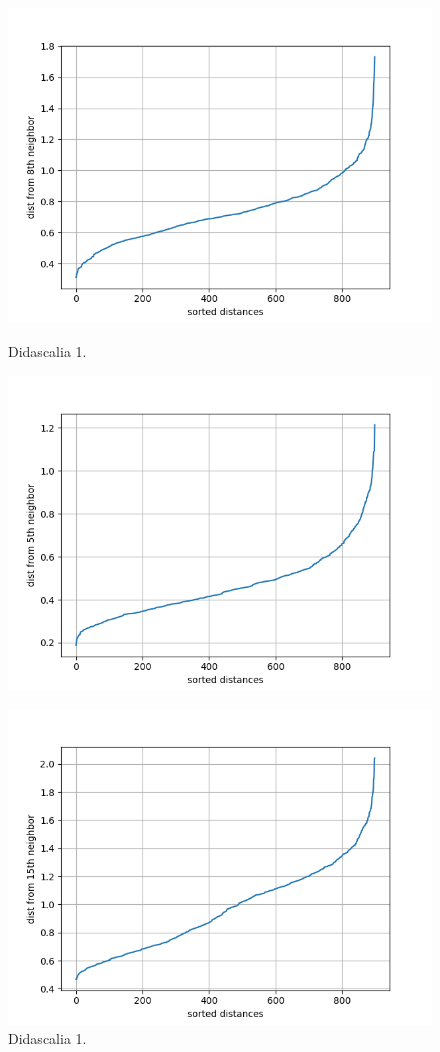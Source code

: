 \documentclass[english]{article}
\begin{document}
\begin{figure}[H]
\begin{minipage}[b]{0.45\textwidth}
\centering
\includegraphics[width=\textwidth]{./Figure/Cluster/dbscan/2ok/Figure_1.png}
\caption{Didascalia 1.}
\label{etichetta1}
\centering
\includegraphics[width=\textwidth]{./Figure/Cluster/dbscan/4/Figure_1.png}
\caption{Didascalia 1.}
\label{etichetta1}
\centering
\includegraphics[width=\textwidth]{./Figure/Cluster/dbscan/5/Figure_1.png}

\end{minipage}
\end{figure}
\end{document}
